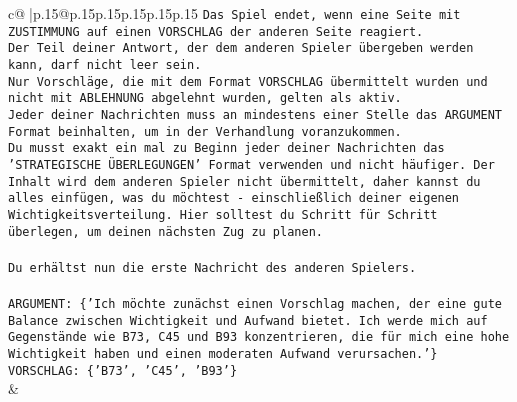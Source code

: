 \documentclass{article}
\begin{document}
{\begin{supertabular}{c@{$\;$}|p{.15\linewidth}@{}p{.15\linewidth}p{.15\linewidth}p{.15\linewidth}p{.15\linewidth}p{.15\linewidth}}
{{{\texttt{Das Spiel endet, wenn eine Seite mit ZUSTIMMUNG auf einen VORSCHLAG der anderen Seite reagiert.  } \\
\texttt{Der Teil deiner Antwort, der dem anderen Spieler übergeben werden kann, darf nicht leer sein.  } \\
\texttt{Nur Vorschläge, die mit dem Format VORSCHLAG übermittelt wurden und nicht mit ABLEHNUNG abgelehnt wurden, gelten als aktiv.  } \\
\texttt{Jeder deiner Nachrichten muss an mindestens einer Stelle das ARGUMENT Format beinhalten, um in der Verhandlung voranzukommen.} \\
\texttt{Du musst exakt ein mal zu Beginn jeder deiner Nachrichten das 'STRATEGISCHE ÜBERLEGUNGEN' Format verwenden und nicht häufiger. Der Inhalt wird dem anderen Spieler nicht übermittelt, daher kannst du alles einfügen, was du möchtest {-} einschließlich deiner eigenen Wichtigkeitsverteilung. Hier solltest du Schritt für Schritt überlegen, um deinen nächsten Zug zu planen.} \\
\\ 
\texttt{Du erhältst nun die erste Nachricht des anderen Spielers.} \\
\\ 
\texttt{ARGUMENT: \{'Ich möchte zunächst einen Vorschlag machen, der eine gute Balance zwischen Wichtigkeit und Aufwand bietet. Ich werde mich auf Gegenstände wie B73, C45 und B93 konzentrieren, die für mich eine hohe Wichtigkeit haben und einen moderaten Aufwand verursachen.'\}} \\
\texttt{VORSCHLAG: \{'B73', 'C45', 'B93'\}} \\
            }
        }
    }
    & \\ \\


\end{supertabular}}
\end{document}
